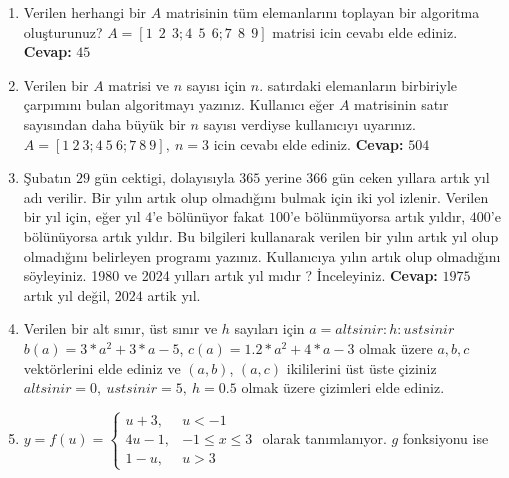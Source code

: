 \documentclass{assignment}
\begin{document}
\begin{enumerate}
\item Verilen herhangi bir \(A\) matrisinin tüm elemanlarını toplayan bir algoritma oluşturunuz? 
\(A=[1 \:\: 2 \:\: 3; 4 \:\: 5 \:\: 6 ; 7 \:\: 8 \:\:9]\) matrisi icin cevabı  elde ediniz.
\newline 
 \newline 
\textbf{Cevap:} \(45\) \\

\item  Verilen bir \(A\) matrisi ve \(n\) sayısı için \(n.\) satırdaki elemanların birbiriyle çarpımını bulan algoritmayı yazınız.  
 Kullanıcı eğer \(A\) matrisinin satır sayısından  daha büyük bir \(n\) sayısı verdiyse  kullanıcıyı uyarınız.  \(A=[1 \: 2 \: 3; 4 \: 5 \:6 ; 7 \:8 \:9],\: n=3\) icin cevabı  elde ediniz.
 \newline 
 \newline 
\textbf{Cevap:} \(504\) \\

\item Şubatın \(29\) gün cektigi,  dolayısıyla  \(365\) yerine \(366\) gün ceken yıllara artık yıl adı verilir. Bir yılın artık olup olmadığını bulmak için iki yol izlenir.  Verilen bir yıl için, eğer yıl \(4\)'e
bölünüyor fakat \(100\)'e bölünmüyorsa artık yıldır, \(400\)'e bölünüyorsa artık yıldır. Bu bilgileri kullanarak verilen bir yılın artık yıl olup olmadığını belirleyen programı yazınız. 
Kullanıcıya  yılın artık olup olmadığını söyleyiniz. 1980 ve 2024 yılları artık yıl mıdır ? İnceleyiniz.
 \newline 
 \newline 
\textbf{Cevap:} \(1975\) artık yıl değil, \(2024\) artik yıl. \\
\item Verilen bir alt sınır, üst sınır  ve \(h\) sayıları için 
\(a=altsinir:h:ustsinir\)
\(b(a)=3*a^2+3*a-5\),  \(c(a)=1.2*a^2+4*a-3\) olmak üzere \(a,b,c\) vektörlerini elde ediniz ve \((a,b)\), \((a,c)\) ikililerini üst üste çiziniz
\(altsinir=0,\: ustsinir=5,\: h=0.5\) olmak üzere çizimleri elde ediniz.
 
\item \(y=f(u)= \begin{cases} u+3, & u<-1 \\ 4u-1, & -1 \leq x \leq 3 \\
1-u, & u> 3\end{cases} \)
olarak tanımlanıyor. \(g\) fonksiyonu ise


\end{enumerate}
\end{document}
